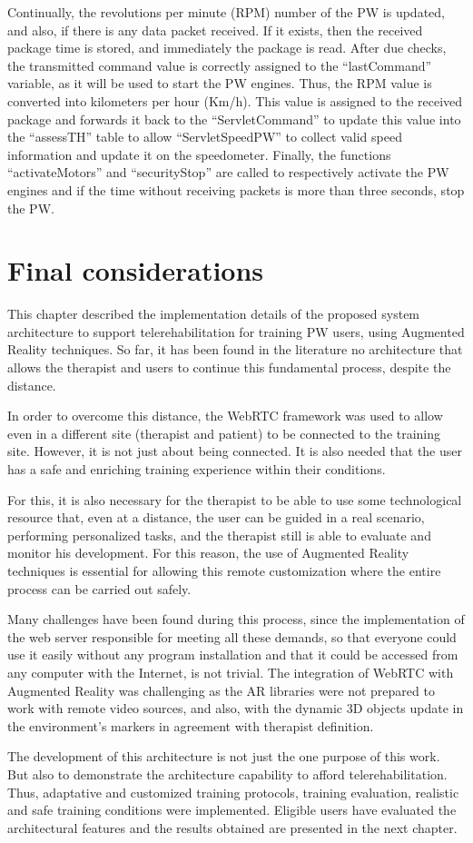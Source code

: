 Continually, the revolutions per minute (RPM) number of the PW is updated,  and also, if there is any data packet received. If it exists, then the received package time is stored, and immediately the package is read. After due checks, the transmitted command value is correctly assigned to the ``lastCommand'' variable, as it will be used to start the PW engines. Thus, the RPM value is converted into kilometers per hour (Km/h). This value is assigned to the received package and forwards it back to the ``ServletCommand'' to update this value into the ``assessTH'' table to allow ``ServletSpeedPW'' to collect valid speed information and update it on the speedometer. Finally, the functions ``activateMotors'' and ``securityStop'' are called to respectively activate the PW engines and if the time without receiving packets is more than three seconds, stop the PW.


\section{Final considerations}

This chapter described the implementation details of the proposed system architecture to support telerehabilitation for training PW users, using Augmented Reality techniques. So far, it has been found in the literature no architecture that allows the therapist and users to continue this fundamental process, despite the distance. 

In order to overcome this distance, the WebRTC framework was used to allow even in a different site (therapist and patient) to be connected to the training site. However, it is not just about being connected. It is also needed that the user has a safe and enriching training experience within their conditions. 

For this, it is also necessary for the therapist to be able to use some technological resource that, even at a distance, the user can be guided in a real scenario, performing personalized tasks, and the therapist still is able to evaluate and monitor his development.  For this reason, the use of Augmented Reality techniques is essential for allowing this remote customization where the entire process can be carried out safely. 

Many challenges have been found during this process, since the implementation of the web server responsible for meeting all these demands, so that everyone could use it easily without any program installation and that it could be accessed from any computer with the Internet, is not trivial. The integration of WebRTC with Augmented Reality was challenging as the AR libraries were not prepared to work with remote video sources, and also, with the dynamic 3D objects update in the environment's markers in agreement with therapist definition.
 
The development of this architecture is not just the one purpose of this work. But also to demonstrate the architecture capability to afford telerehabilitation. Thus, adaptative and customized training protocols, training evaluation, realistic and safe training conditions were implemented. Eligible users have evaluated the architectural features and the results obtained are presented in the next chapter.